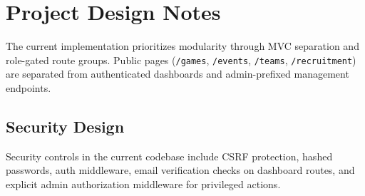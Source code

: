 \section{Project Design Notes}
The current implementation prioritizes modularity through MVC separation and role-gated route groups. Public pages (\texttt{/games}, \texttt{/events}, \texttt{/teams}, \texttt{/recruitment}) are separated from authenticated dashboards and admin-prefixed management endpoints.

\subsection{Security Design}
Security controls in the current codebase include CSRF protection, hashed passwords, auth middleware, email verification checks on dashboard routes, and explicit admin authorization middleware for privileged actions.
